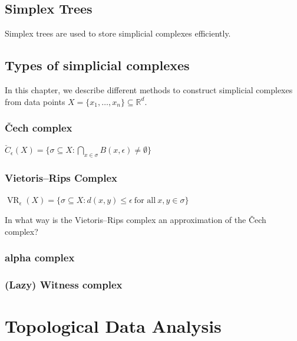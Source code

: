 



\subsection{Simplex Trees}

Simplex trees are used to store simplicial complexes efficiently.

\subsection{Types of simplicial complexes}
In this chapter, we describe different methods to construct simplicial complexes from data points $X=\{x_1,\dots,x_n\}\subseteq\mathbb{R}^d$.

\subsubsection{\v{C}ech complex}

$\check{C}_{\epsilon}(X)=\{\sigma\subseteq X:\bigcap\limits_{x\in\sigma} B(x,\epsilon)\ne\emptyset\}$

\subsubsection{Vietoris--Rips Complex}

$\operatorname{VR}_{\epsilon}(X)=\{\sigma\subseteq X:d(x,y)\le\epsilon\ \text{for all} \ x,y\in\sigma\}$

In what way is the Vietoris--Rips complex an approximation of the \v{C}ech complex?

\subsubsection{alpha complex}

\subsubsection{(Lazy) Witness complex}

\section{Topological Data Analysis}

